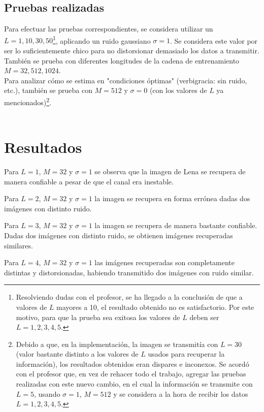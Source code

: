 \documentclass[10pt,journal,compsoc]{IEEEtran}
\begin{document}
\subsection{Pruebas realizadas}
Para efectuar las pruebas correspondientes, se considera utilizar un $L={1,10,30,50}$\footnote[1]{Resolviendo dudas con el profesor, se ha llegado a la conclusi\'on de que a valores de $L$ mayores a 10, el resultado obtenido no es satisfactorio. Por este motivo, para que la prueba sea exitosa los valores de $L$ deben ser $L={1, 2, 3, 4, 5}$.}, aplicando un ruido gaussiano $\sigma=1$. Se considera este valor por ser lo suficientemente chico para no distorsionar demasiado los datos a transmitir. Tambi\'en se prueba con diferentes longitudes de la cadena de entrenamiento $M={32,512,1024}$. \\  Para analizar c\'omo se estima en "condiciones \'optimas" (verbigracia: sin ruido, etc.), tambi\'en se prueba con $M=512$ y $\sigma=0$ (con los valores de $L$ ya mencionados)\footnote[2]{Debido a que, en la implementaci\'on, la imagen se transmit\'ia con $L=30$ (valor bastante distinto a los valores de $L$ usados para recuperar la informaci\'on), los resultados obtenidos eran dispares e inconexos. Se acord\'o con el profesor que, en vez de rehacer todo el trabajo, agregar las pruebas realizadas con este nuevo cambio, en el cual la informaci\'on se transmite con $L=5$, usando $\sigma=1$, $M=512$ y se considera a la hora de recibir los datos $L={1, 2, 3, 4, 5}$.}.\\
\\


\section{Resultados}

Para $L = {1}$, $M = {32}$ y $\sigma = 1$ se observa que la imagen de Lena se recupera de manera confiable a pesar de que el canal era inestable.

Para $L = {2}$, $M = {32}$ y $\sigma = 1$ la imagen se recupera en forma err\'onea dadas dos im\'agenes con distinto ruido.

Para $L = {3}$, $M = {32}$ y $\sigma = 1$ la imagen se recupera de manera bastante confiable. Dadas dos im\'agenes con distinto ruido, se obtienen im\'agenes recuperadas similares.

Para $L = {4}$, $M = {32}$ y $\sigma = 1$ las im\'agenes recuperadas son completamente distintas y distorsionadas, habiendo transmitido dos im\'agenes con ruido similar.
\end{document}
